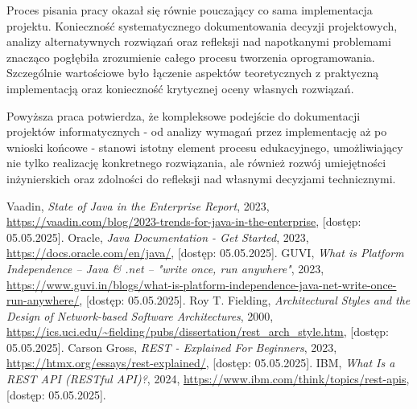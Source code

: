 \documentclass[a4paper,12pt,openany]{book}
\begin{document}
Proces pisania pracy okazał się równie pouczający co sama implementacja projektu. Konieczność systematycznego dokumentowania decyzji projektowych, analizy alternatywnych rozwiązań oraz refleksji nad napotkanymi problemami znacząco pogłębiła zrozumienie całego procesu tworzenia oprogramowania. Szczególnie wartościowe było łączenie aspektów teoretycznych z praktyczną implementacją oraz konieczność krytycznej oceny własnych rozwiązań.

Powyższa praca potwierdza, że kompleksowe podejście do dokumentacji projektów informatycznych - od analizy wymagań przez implementację aż po wnioski końcowe - stanowi istotny element procesu edukacyjnego, umożliwiający nie tylko realizację konkretnego rozwiązania, ale również rozwój umiejętności inżynierskich oraz zdolności do refleksji nad własnymi decyzjami technicznymi.



\listoffigures{} %

\begin{thebibliography}{99}
 Vaadin, \textit{State of Java in the Enterprise Report}, 2023, \url{https://vaadin.com/blog/2023-trends-for-java-in-the-enterprise}, [dostęp: 05.05.2025].
 Oracle, \textit{Java Documentation - Get Started}, 2023, \url{https://docs.oracle.com/en/java/}, [dostęp: 05.05.2025].
 GUVI, \textit{What is Platform Independence – Java \& .net – "write once, run anywhere"}, 2023, \url{https://www.guvi.in/blogs/what-is-platform-independence-java-net-write-once-run-anywhere/}, [dostęp: 05.05.2025].
 Roy T. Fielding, \textit{Architectural Styles and the Design of Network-based Software Architectures}, 2000, \url{https://ics.uci.edu/~fielding/pubs/dissertation/rest_arch_style.htm}, [dostęp: 05.05.2025].
 Carson Gross, \textit{REST - Explained For Beginners}, 2023, \url{https://htmx.org/essays/rest-explained/}, [dostęp: 05.05.2025].
 IBM, \textit{What Is a REST API (RESTful API)?}, 2024, \url{https://www.ibm.com/think/topics/rest-apis}, [dostęp: 05.05.2025].
\end{thebibliography}
\end{document}
